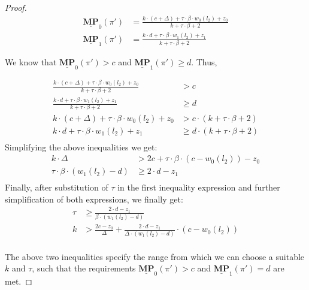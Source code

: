\begin{proof}
\begin{align*}
    \underline{\mathbf{MP}}_0(\pi') &= \frac{k\cdot(c+\Delta) + \tau \cdot \beta \cdot w_0(l_2) + z_0}{k + \tau\cdot\beta + 2}\\
    \underline{\mathbf{MP}}_1(\pi') &= \frac{k\cdot d + \tau \cdot \beta \cdot w_1(l_2) + z_1}{k + \tau\cdot\beta + 2}
\end{align*}

\noindent We know that $\underline{\mathbf{MP}}_0(\pi') > c$ and $\underline{\mathbf{MP}}_1(\pi') \geqslant d$. Thus,

\begin{align*}
    \frac{k\cdot(c+\Delta) + \tau \cdot \beta \cdot w_0(l_2) + z_0}{k + \tau\cdot\beta + 2} &> c\\
    \frac{k\cdot d + \tau \cdot \beta \cdot w_1(l_2) + z_1}{k + \tau\cdot\beta + 2} &\geqslant d\\
    k\cdot(c+\Delta) + \tau \cdot \beta \cdot w_0(l_2) + z_0 &> c \cdot (k + \tau\cdot\beta + 2)\\
    k\cdot d + \tau \cdot \beta \cdot w_1(l_2) + z_1 &\geqslant d \cdot (k + \tau\cdot\beta + 2)\\
\end{align*}
Simplifying the above inequalities we get:
\begin{align*}
    k\cdot\Delta &> 2c + \tau \cdot \beta \cdot (c - w_0(l_2)) - z_0 \\
    \tau \cdot \beta \cdot (w_1(l_2) - d) &\geqslant 2\cdot d - z_1 \\
\end{align*}
Finally, after substitution of $\tau$ in the first inequality expression and further simplification of both expressions, we finally get:
\begin{align*}
    \tau &\geqslant \frac{2\cdot d - z_1}{\beta \cdot (w_1(l_2) - d)}\\
    k &> \frac{2c - z_0}{\Delta} +  \frac{2\cdot d - z_1} {\Delta \cdot (w_1(l_2) - d)} \cdot (c - w_0(l_2)) \\
\end{align*}

\noindent The above two inequalities specify the range from which we can choose a suitable $k$ and $\tau$, such that the requirements $\underline{\mathbf{MP}}_0(\pi') > c$ and $\underline{\mathbf{MP}}_1(\pi') = d$ are met.
\end{proof}